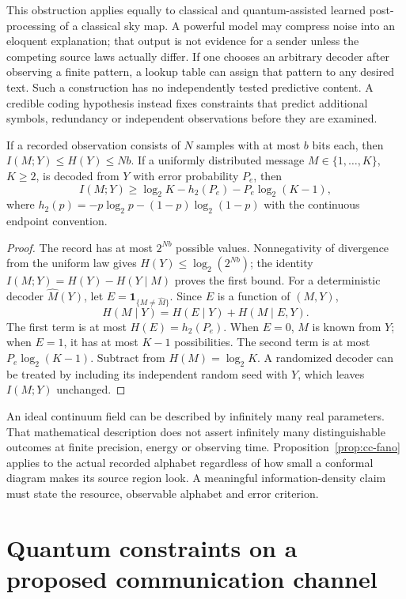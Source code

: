 This obstruction applies equally to classical and quantum-assisted
learned post-processing of a classical sky map. A powerful model may
compress noise into an eloquent explanation; that output is not evidence
for a sender unless the competing source laws actually differ. If one
chooses an arbitrary decoder after observing a finite pattern, a lookup
table can assign that pattern to any desired text. Such a construction
has no independently tested predictive content. A credible coding
hypothesis instead fixes constraints that predict additional symbols,
redundancy or independent observations before they are examined.

\begin{proposition}
\label{prop:cc-fano}
If a recorded observation consists of $N$ samples with at most $b$ bits
each, then $I(M;Y)\le H(Y)\le Nb$. If a uniformly distributed message
$M\in\{1,\ldots,K\}$, $K\ge2$, is decoded from $Y$ with error
probability $P_e$, then
\[
 I(M;Y)\ge\log_2K-h_2(P_e)-P_e\log_2(K-1),
\]
where $h_2(p)=-p\log_2p-(1-p)\log_2(1-p)$ with the continuous endpoint
convention.
\end{proposition}

\begin{proof}
The record has at most $2^{Nb}$ possible values. Nonnegativity of
divergence from the uniform law gives $H(Y)\le\log_2(2^{Nb})$; the
identity $I(M;Y)=H(Y)-H(Y\mid M)$ proves the first bound.
For a deterministic decoder $\widehat M(Y)$, let
$E=\mathbf1_{\{M\ne\widehat M\}}$. Since $E$ is a function of $(M,Y)$,
\[
 H(M\mid Y)=H(E\mid Y)+H(M\mid E,Y).
\]
The first term is at most $H(E)=h_2(P_e)$. When $E=0$, $M$ is known
from $Y$; when $E=1$, it has at most $K-1$ possibilities. The second
term is at most $P_e\log_2(K-1)$. Subtract from $H(M)=\log_2K$.
A randomized decoder can be treated by including its independent random
seed with $Y$, which leaves $I(M;Y)$ unchanged.
\end{proof}

An ideal continuum field can be described by infinitely many real
parameters. That mathematical description does not assert infinitely
many distinguishable outcomes at finite precision, energy or observing
time. Proposition~\ref{prop:cc-fano} applies to the actual recorded
alphabet regardless of how small a conformal diagram makes its source
region look. A meaningful information-density claim must state the
resource, observable alphabet and error criterion.

\section{Quantum constraints on a proposed communication channel}

